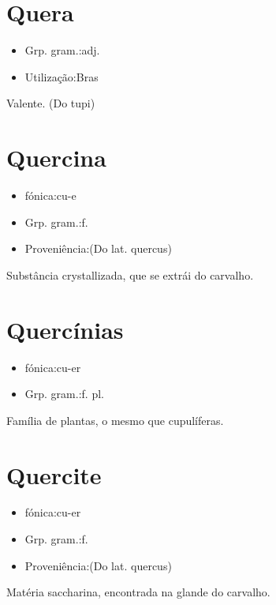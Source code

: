 \section{Quera}
\begin{itemize}
\item {Grp. gram.:adj.}
\end{itemize}
\begin{itemize}
\item {Utilização:Bras}
\end{itemize}
Valente.
(Do tupi)
\section{Quercina}
\begin{itemize}
\item {fónica:cu-e}
\end{itemize}
\begin{itemize}
\item {Grp. gram.:f.}
\end{itemize}
\begin{itemize}
\item {Proveniência:(Do lat. \textunderscore quercus\textunderscore )}
\end{itemize}
Substância crystallizada, que se extrái do carvalho.
\section{Quercínias}
\begin{itemize}
\item {fónica:cu-er}
\end{itemize}
\begin{itemize}
\item {Grp. gram.:f. pl.}
\end{itemize}
Família de plantas, o mesmo que \textunderscore cupulíferas\textunderscore .
\section{Quercite}
\begin{itemize}
\item {fónica:cu-er}
\end{itemize}
\begin{itemize}
\item {Grp. gram.:f.}
\end{itemize}
\begin{itemize}
\item {Proveniência:(Do lat. \textunderscore quercus\textunderscore )}
\end{itemize}
Matéria saccharina, encontrada na glande do carvalho.
